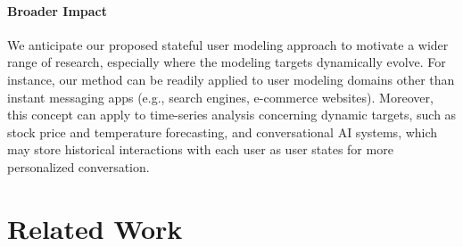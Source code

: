 \documentclass{article}
\begin{document}
\paragraph{Broader Impact} We anticipate our proposed stateful user modeling approach to motivate a wider range of research, especially where the modeling targets dynamically evolve. For instance, our method can be readily applied to user modeling domains other than instant messaging apps (e.g., search engines, e-commerce websites). Moreover, this concept can apply to time-series analysis concerning dynamic targets, such as stock price and temperature forecasting, and conversational AI systems, which may store historical interactions with each user as user states for more personalized conversation.


  
  


\newpage
\appendix

\section{Related Work}

\end{document}
